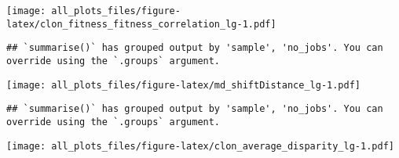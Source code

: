 \documentclass[
]{article}
\begin{document}
\texttt{[image: all\_plots\_files/figure-latex/clon\_fitness\_fitness\_correlation\_lg-1.pdf]}

\begin{verbatim}
## `summarise()` has grouped output by 'sample', 'no_jobs'. You can override using the `.groups` argument.
\end{verbatim}

\texttt{[image: all\_plots\_files/figure-latex/md\_shiftDistance\_lg-1.pdf]}

\begin{verbatim}
## `summarise()` has grouped output by 'sample', 'no_jobs'. You can override using the `.groups` argument.
\end{verbatim}

\texttt{[image: all\_plots\_files/figure-latex/clon\_average\_disparity\_lg-1.pdf]}
\end{document}
